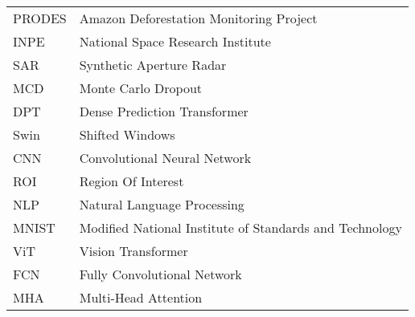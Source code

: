 
\begin{thenotations}
	\noindent	
	\begin{tabular}{ll}	
        PRODES & Amazon Deforestation Monitoring Project \\
        INPE & National Space Research  Institute \\
        SAR & Synthetic Aperture Radar \\
        MCD & Monte Carlo Dropout \\
        DPT & Dense Prediction Transformer \\
        Swin & Shifted Windows \\
        
        CNN & Convolutional Neural Network \\
        ROI & Region Of Interest \\
        NLP & Natural Language Processing \\
        MNIST & Modified National Institute of Standards and Technology \\
        ViT & Vision Transformer \\
        FCN & Fully Convolutional Network \\
        MHA & Multi-Head Attention \\
        

\end{tabular}
\end{thenotations}
